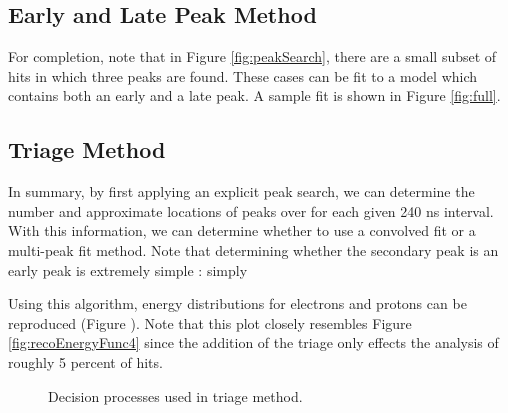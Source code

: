 \subsection{Early and Late Peak Method}
For completion, note that in Figure \ref{fig:peakSearch}, there are a small subset of hits in which three peaks are found. These cases can be fit to a model which contains both an early and a late peak. A sample fit is shown in Figure \ref{fig:full}.



\subsection{Triage Method}
In summary, by first applying an explicit peak search, 
we can determine the number and approximate locations of peaks over for each given 240 ns interval. With this information, we can determine whether to use a convolved fit or a multi-peak fit method. Note that determining whether the secondary peak is an early peak is extremely simple : simply 


Using this algorithm, energy distributions for electrons and protons can be reproduced (Figure ). Note that this plot closely resembles Figure \ref{fig:recoEnergyFunc4} since the addition of the triage only effects the analysis of roughly 5 percent of hits.

\begin{figure}[htp!]
    \centering
    \caption{Decision processes used in triage method.}
    \label{fig:triage}
\end{figure} 



